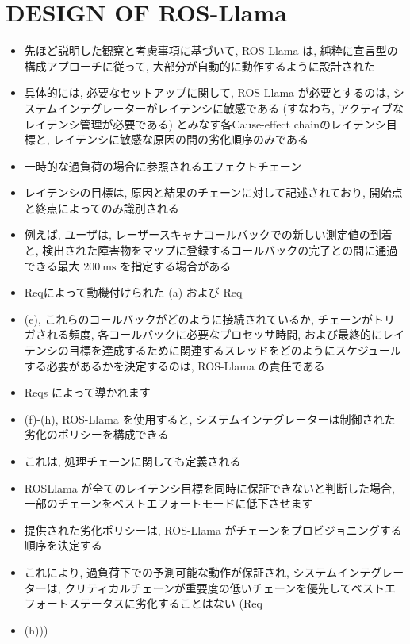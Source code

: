 
\section{DESIGN OF ROS-Llama}
\label{sec: design of ros-llama}

\begin{frame}{}
    \begin{itemize}
        \item 先ほど説明した観察と考慮事項に基づいて, ROS-Llama は, 純粋に宣言型の構成アプローチに従って, 大部分が自動的に動作するように設計された
\item 具体的には, 必要なセットアップに関して, ROS-Llama が必要とするのは, システムインテグレーターがレイテンシに敏感である (すなわち, アクティブなレイテンシ管理が必要である) とみなす各Cause-effect chainのレイテンシ目標と, レイテンシに敏感な原因の間の劣化順序のみである
\item 一時的な過負荷の場合に参照されるエフェクトチェーン
    \end{itemize}
\end{frame}

\begin{frame}{}
    \begin{itemize}
        \item レイテンシの目標は, 原因と結果のチェーンに対して記述されており, 開始点と終点によってのみ識別される
\item 例えば, ユーザは, レーザースキャナコールバックでの新しい測定値の到着と, 検出された障害物をマップに登録するコールバックの完了との間に通過できる最大 $200 \mathrm{~ms}$ を指定する場合がある
\item Reqによって動機付けられた (a) および Req
\item (e), これらのコールバックがどのように接続されているか, チェーンがトリガされる頻度, 各コールバックに必要なプロセッサ時間, および最終的にレイテンシの目標を達成するために関連するスレッドをどのようにスケジュールする必要があるかを決定するのは, ROS-Llama の責任である
    \end{itemize}
\end{frame}

\begin{frame}{}
    \begin{itemize}
        \item Reqs によって導かれます
\item (f)-(h), ROS-Llama を使用すると, システムインテグレーターは制御された劣化のポリシーを構成できる
\item これは, 処理チェーンに関しても定義される
\item ROSLlama が全てのレイテンシ目標を同時に保証できないと判断した場合, 一部のチェーンをベストエフォートモードに低下させます
\item 提供された劣化ポリシーは, ROS-Llama がチェーンをプロビジョニングする順序を決定する
\item これにより, 過負荷下での予測可能な動作が保証され, システムインテグレーターは, クリティカルチェーンが重要度の低いチェーンを優先してベストエフォートステータスに劣化することはない (Req
\item (h)))
    \end{itemize}
\end{frame}


